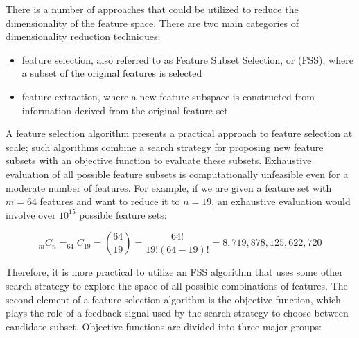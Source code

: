 There is a number of approaches that could be utilized to reduce the dimensionality of the feature space.
There are two main categories of dimensionality reduction techniques:
\begin{itemize}
    \item feature selection, also referred to as Feature Subset Selection, or (FSS), where a subset of the original features is selected
    \item feature extraction, where a new feature subspace is constructed from information derived from the original feature set
\end{itemize}

A feature selection algorithm presents a practical approach to feature selection at scale;
such algorithms combine a search strategy for proposing new feature subsets with an objective function to evaluate these subsets.
Exhaustive evaluation of all possible feature subsets is computationally unfeasible even for a moderate number of features.
For example, if we are given a feature set with $m = 64$ features and want to reduce it to $n = 19$, an exhaustive evaluation would involve over $10^{15}$ possible feature sets:

\begin{equation}
    _{m}C_n = _{64}C_{19} = \binom{64} {19} = \frac{64!} {19!(64 - 19)!} = 8,719,878,125,622,720
\end{equation}

Therefore, it is more practical to utilize an FSS algorithm that uses some other search strategy to explore the space of all possible combinations of features.
The second element of a feature selection algorithm is the objective function, which plays the role of a feedback signal used by the search strategy to choose between candidate subset.
Objective functions are divided into three major groups:

